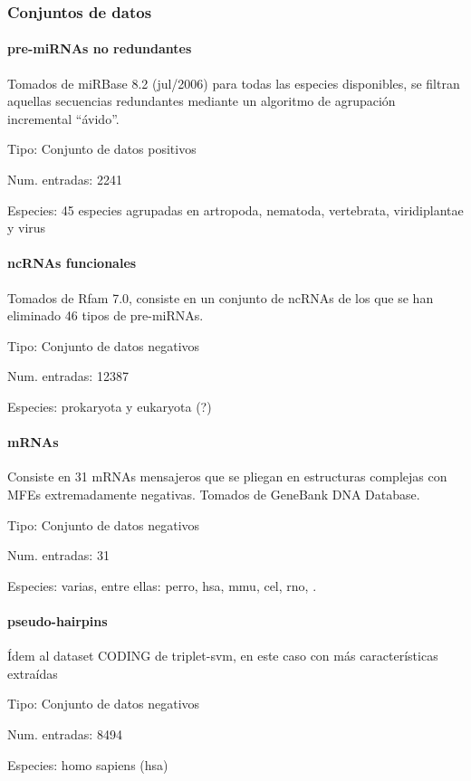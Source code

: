 \documentclass[12pt,bibliography=openstyle,DIV=12,parskip=half-]{scrartcl}
\begin{document}
\subsubsection{Conjuntos de datos}
\paragraph{pre-miRNAs no redundantes}
Tomados de miRBase 8.2 (jul/2006) para todas las especies disponibles,
se filtran aquellas secuencias redundantes mediante un algoritmo de
agrupación incremental ``ávido''\cite{greedy}.
\begin{description*}
\item[Tipo:] Conjunto de datos positivos
\item[Num. entradas:] 2241
\item[Especies:] 45 especies agrupadas en artropoda, nematoda,
  vertebrata, viridiplantae y virus
\end{description*}

\paragraph{ncRNAs funcionales}
Tomados de Rfam 7.0, consiste en un conjunto de ncRNAs de los que se
han eliminado 46 tipos de pre-miRNAs.
\begin{description*}
\item[Tipo:] Conjunto de datos negativos
\item[Num. entradas:] 12387
\item[Especies:] prokaryota y eukaryota (?)
\end{description*}

\paragraph{mRNAs}
Consiste en 31 mRNAs mensajeros que se pliegan en estructuras
complejas con MFEs extremadamente negativas. Tomados de GeneBank DNA
Database.
\begin{description*}
\item[Tipo:] Conjunto de datos negativos
\item[Num. entradas:] 31
\item[Especies:] varias, entre ellas: perro, hsa, mmu, cel, rno, \textellipsis.
\end{description*}

\paragraph{pseudo-hairpins}
Ídem al dataset CODING de triplet-svm, en este caso con más
características extraídas
\begin{description*}
\item[Tipo:] Conjunto de datos negativos
\item[Num. entradas:] 8494
\item[Especies:] homo sapiens (hsa)
\end{description*}
%
%
%
%
%
\end{document}
